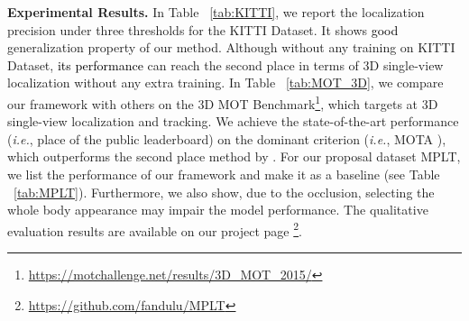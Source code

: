 \documentclass{article}
\newcommand{\ie}{{\it i.e.}}
\newcommand{\YangProof}[1]{\textcolor{black}{#1}}
\begin{document}
\noindent \textbf{Experimental Results.}
In Table ~\ref{tab:KITTI}, we report the localization precision under three thresholds for the KITTI Dataset. It shows \YangProof{good} generalization property of our method. Although without any training on KITTI Dataset, \YangProof{its performance} can reach the second place in terms of 3D single-view localization without any extra training. In Table ~\ref{tab:MOT_3D}, we compare our framework with others on the 3D MOT Benchmark\footnote{\url{https://motchallenge.net/results/3D_MOT_2015/}}, which targets at 3D single-view localization and tracking. We achieve the state-of-the-art performance (\ie,  place of the public leaderboard) on the dominant criterion (\ie, MOTA \cite{ristani2016performance}), which outperforms the second place method by . For our proposal dataset MPLT, we list the performance of our framework and make it as a baseline (see Table ~\ref{tab:MPLT}). Furthermore, we also show, due to the occlusion, selecting the whole body appearance may impair the model performance. The qualitative evaluation results are available on our project page \footnote{\url{https://github.com/fandulu/MPLT}}.

\vspace{-17px}
\begin{table}[!h]
\centering
\caption{Monocular-camera-based localization precision on KITTI Dataset. If distance from predicted locations to ground-truth location is within a threshold, it is correctly predicted.}
\label{tab:KITTI}
\end{table}
\end{document}
